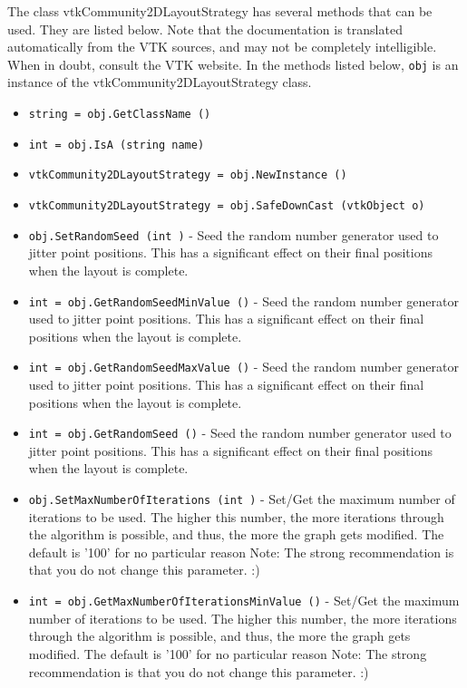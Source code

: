 The class vtkCommunity2DLayoutStrategy has several methods that can be used.
  They are listed below.
Note that the documentation is translated automatically from the VTK sources,
and may not be completely intelligible.  When in doubt, consult the VTK website.
In the methods listed below, \verb|obj| is an instance of the vtkCommunity2DLayoutStrategy class.
\begin{itemize}
\item  \verb|string = obj.GetClassName ()|

\item  \verb|int = obj.IsA (string name)|

\item  \verb|vtkCommunity2DLayoutStrategy = obj.NewInstance ()|

\item  \verb|vtkCommunity2DLayoutStrategy = obj.SafeDownCast (vtkObject o)|

\item  \verb|obj.SetRandomSeed (int )| -  Seed the random number generator used to jitter point positions.
 This has a significant effect on their final positions when
 the layout is complete.

\item  \verb|int = obj.GetRandomSeedMinValue ()| -  Seed the random number generator used to jitter point positions.
 This has a significant effect on their final positions when
 the layout is complete.

\item  \verb|int = obj.GetRandomSeedMaxValue ()| -  Seed the random number generator used to jitter point positions.
 This has a significant effect on their final positions when
 the layout is complete.

\item  \verb|int = obj.GetRandomSeed ()| -  Seed the random number generator used to jitter point positions.
 This has a significant effect on their final positions when
 the layout is complete.

\item  \verb|obj.SetMaxNumberOfIterations (int )| -  Set/Get the maximum number of iterations to be used.
 The higher this number, the more iterations through the algorithm
 is possible, and thus, the more the graph gets modified.
 The default is '100' for no particular reason
 Note: The strong recommendation is that you do not change
 this parameter. :)

\item  \verb|int = obj.GetMaxNumberOfIterationsMinValue ()| -  Set/Get the maximum number of iterations to be used.
 The higher this number, the more iterations through the algorithm
 is possible, and thus, the more the graph gets modified.
 The default is '100' for no particular reason
 Note: The strong recommendation is that you do not change
 this parameter. :)


\end{itemize}
